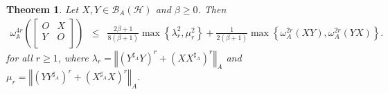 \documentclass{article}
\newcommand{\bra}[1]{\left(#1\right)}
\newcommand{\normA}[1]{{\left\Vert#1\right\Vert}_{A}}
\newcommand{\set}[1]{\left\{#1\right\}}
\newcommand {\A}{\mathbb{A}}
\newcommand {\h}{\mathcal{H}}
\newcommand {\Xa}{X^{\sharp_{A}}}
\renewcommand {\b}{\mathcal{B}}
\newcommand {\Ya}{Y^{\sharp_{A}}}
\newtheorem{theorem}{Theorem}[section]
\begin{document}
\begin{theorem}\label{Thm:beta} Let $X,Y\in\b_A(\h)$ and $\beta\geq 0$. Then
\begin{eqnarray*}
  \omega_{\A}^{4r}\bra{\begin{bmatrix} O& X\\ Y& O \\\end{bmatrix}}&\leq& \frac{2\beta+1}{8(\beta+1)}\max\set{\lambda_r^2,\mu_r^2}+\frac{1}{2(\beta+1)}\max\set{\omega_A^{2r}(XY),\omega_A^{2r}(YX)}.
\end{eqnarray*}
for all $r\geq 1$, where  $\lambda_r=\normA{\bra{\Ya Y}^r+\bra{X\Xa}^r}$ and  $\mu_r=\normA{\bra{Y\Ya }^r+\bra{\Xa X}^r}$.
\end{theorem}
\end{document}

